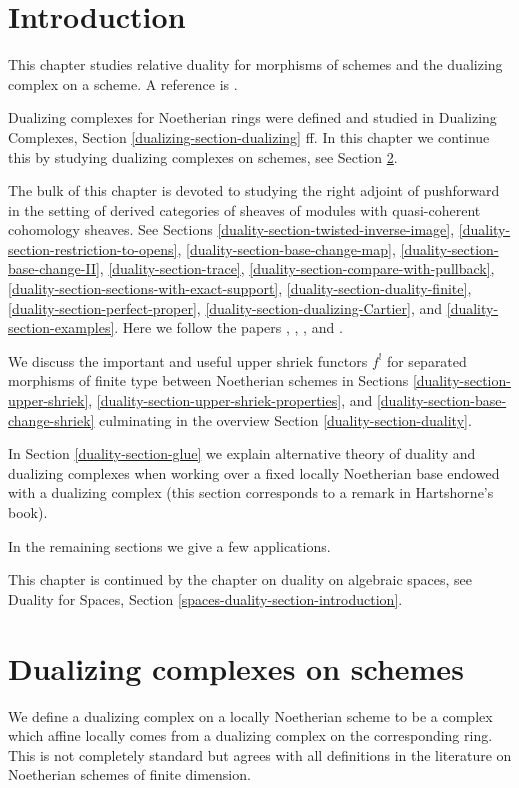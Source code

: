 \section{Introduction}
\label{duality-section-introduction}
This chapter studies relative duality for morphisms of schemes
and the dualizing complex on a scheme. A reference is \cite{RD}.

\medskip\noindent
Dualizing complexes for Noetherian rings were defined and studied in
Dualizing Complexes, Section \ref{dualizing-section-dualizing} ff.
In this chapter we continue this by studying dualizing complexes on
schemes, see Section \ref{duality-section-dualizing-schemes}.

\medskip\noindent
The bulk of this chapter is devoted to studying the right adjoint
of pushforward in the setting of derived categories of sheaves
of modules with quasi-coherent cohomology sheaves.
See Sections
\ref{duality-section-twisted-inverse-image},
\ref{duality-section-restriction-to-opens},
\ref{duality-section-base-change-map},
\ref{duality-section-base-change-II},
\ref{duality-section-trace},
\ref{duality-section-compare-with-pullback},
\ref{duality-section-sections-with-exact-support},
\ref{duality-section-duality-finite},
\ref{duality-section-perfect-proper},
\ref{duality-section-dualizing-Cartier}, and
\ref{duality-section-examples}.
Here we follow the papers
\cite{Neeman-Grothendieck}, \cite{LN},
\cite{Lipman-notes}, and \cite{Neeman-improvement}.

\medskip\noindent
We discuss the important and useful upper shriek functors $f^!$ for
separated morphisms of finite type between Noetherian schemes in
Sections \ref{duality-section-upper-shriek},
\ref{duality-section-upper-shriek-properties}, and
\ref{duality-section-base-change-shriek}
culminating in the overview Section
\ref{duality-section-duality}.

\medskip\noindent
In Section \ref{duality-section-glue}
we explain alternative theory of duality and dualizing
complexes when working over a fixed locally Noetherian
base endowed with a dualizing complex (this section corresponds
to a remark in Hartshorne's book).

\medskip\noindent
In the remaining sections we give a few applications.

\medskip\noindent
This chapter is continued by the chapter on duality
on algebraic spaces, see
Duality for Spaces, Section \ref{spaces-duality-section-introduction}.

\section{Dualizing complexes on schemes}
\label{duality-section-dualizing-schemes}
We define a dualizing complex on a locally Noetherian scheme
to be a complex which affine locally comes from a dualizing
complex on the corresponding ring. This is not completely
standard but agrees with all definitions in the literature
on Noetherian schemes of finite dimension.

